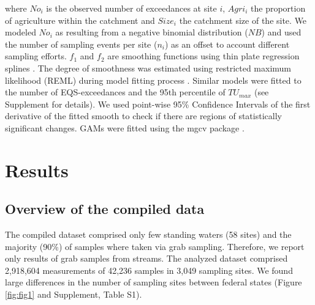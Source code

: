 \documentclass[journal=esthag,manuscript=article]{achemso}
\begin{document}
where $No_i$ is the observed number of exceedances at site $i$, $Agri_i$ the proportion of agriculture within the catchment and $Size_i$ the catchment size of the site. 
We modeled $No_i$ as resulting from a negative binomial distribution ($NB$) and used the number of sampling events per site ($n_i$) as an offset to account different sampling efforts. 
%
%
$f_1$ and $f_2$ are smoothing functions using thin plate regression splines \citep{wood_thin_2003}.
The degree of smoothness was estimated using restricted maximum likelihood (REML) during model fitting process \citep{wood_fast_2011}.
Similar models were fitted to the number of EQS-exceedances and the 95th percentile of $TU_{max}$ (see Supplement for details). 
%
%
We used point-wise 95\% Confidence Intervals of the first derivative of the fitted smooth to check if there are regions of statistically significant changes.
GAMs were fitted using the mgcv package \citep{wood_fast_2011}.


\section{Results}
\subsection{Overview of the compiled data}

The compiled dataset comprised only few standing waters (58 sites) and the majority (90\%) of samples where taken via grab sampling.  %
Therefore, we report only results of grab samples from streams. 
%
%
The analyzed dataset comprised 2,918,604 measurements of 42,236 samples in 3,049 sampling sites.  %
We found large differences in the number of sampling sites between federal states (Figure \ref{fig:fig1} and Supplement, Table S1).
%
%
\end{document}
